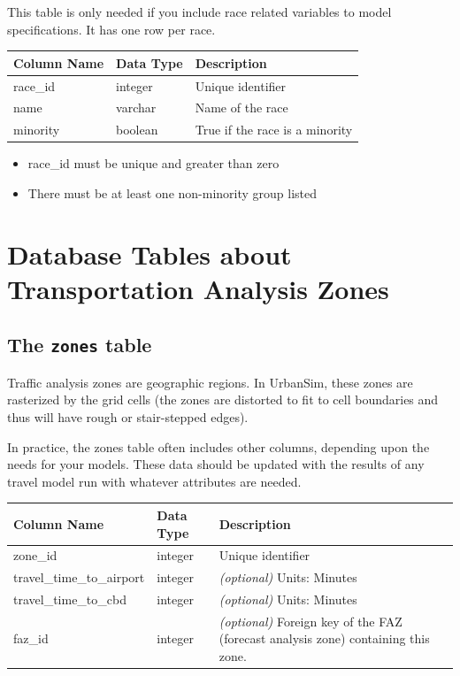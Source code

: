 This table is only needed if you include race related variables to model specifications.
It has one row per race.


\begin{tabular}{lll}
\textbf{Column Name} & \textbf{Data Type} & \textbf{Description} \\
\hline
race_id & integer & Unique identifier  \\
\hline
name & varchar & Name of the race  \\
\hline
minority & boolean & True if the race is a minority  \\
\hline

\end{tabular}

\begin{itemize} \tight
\item race_id must be unique and greater than zero
\item There must be at least one non-minority group listed

\end{itemize}






\section{Database Tables about Transportation Analysis Zones}

\subsection{The {\tt zones} table}

Traffic analysis zones are geographic regions. In UrbanSim, these zones are
rasterized by the grid cells (the zones are distorted to fit to cell boundaries
and thus will have rough or stair-stepped edges).

In practice, the zones table often includes other columns, depending upon the
needs for your models.  These data should be updated with the results of any
travel model run with whatever attributes are needed.

\begin{tabular}{llp{3.5in}}
\textbf{Column Name} & \textbf{Data Type} & \textbf{Description} \\
\hline zone_id & integer & Unique identifier  \\

\hline travel_time_to_airport & integer & \emph{(optional) } Units: Minutes  \\

\hline travel_time_to_cbd & integer & \emph{(optional) } Units: Minutes  \\

\hline faz_id & integer & \emph{(optional) } Foreign key of the FAZ (forecast
analysis zone) containing this zone.   \\

\hline
\end{tabular}

